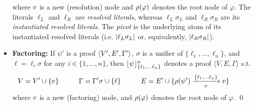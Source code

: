 \begin{definition}
\begin{itemize}
    where $v$ is a new (resolution) node and $\rho(\varphi)$ denotes the root node of $\varphi$.  The literals $\ell_L$ and $\ell_R$ are \emph{resolved literals}, whereas $\ell_L \sigma_L$ and $\ell_R \sigma_R$ are its \emph{instantiated resolved literals}. The \emph{pivot} is the underlying atom of its instantiated resolved literals (i.e. $\lvert\ell_L \sigma_L\rvert$ or, equivalently, $\lvert\ell_R \sigma_R\rvert$).
  \item \textbf{Factoring:}
  If $\psi'$ is a proof $\langle V', E', \Gamma' \rangle$, $\sigma$ is a unifier of $\{\ell_1,\ldots,\ell_n\}$, and $\ell=\ell_i\sigma$ for any $i\in \{1,\ldots,n\}$, then $\lfloor \psi \rfloor_{\{\ell_1, \ldots \ell_n\}}^{\sigma}$ denotes a proof $\langle V, E, \Gamma \rangle$ s.t.
    \begin{align*}
         \hspace{-0.6cm} V &= V' \cup \{\n \}  \hspace*{1cm} \Gamma = \clause' \sigma \cup \{ \ell \} \hspace*{1cm}  E = E' \cup \{ \raiz{\psi'} \xrightarrow[\sigma]{\{\ell_1, \ldots \ell_n\}} \n \} 
    \end{align*}  
    where $v$ is a new (factoring) node, and $\rho(\varphi)$ denotes the root node of $\varphi$.
  \qed
\end{itemize}
\end{definition}





